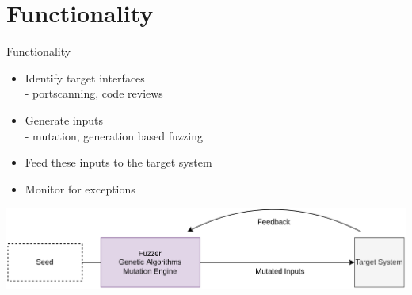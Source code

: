 \documentclass{beamer}
\begin{document}
\section{Functionality}
\begin{frame}{Functionality}
\begin{itemize}
 \item Identify target interfaces\\
 - portscanning, code reviews
 \item Generate inputs\\
 - mutation, generation based fuzzing
 \item Feed these inputs to the target system
 \item Monitor for exceptions
\end{itemize}
\end{frame}
\begin{frame}
\begin{center}
  \includegraphics[scale=0.17]{final2.png}
\end{center}
\end{frame}
\end{document}
